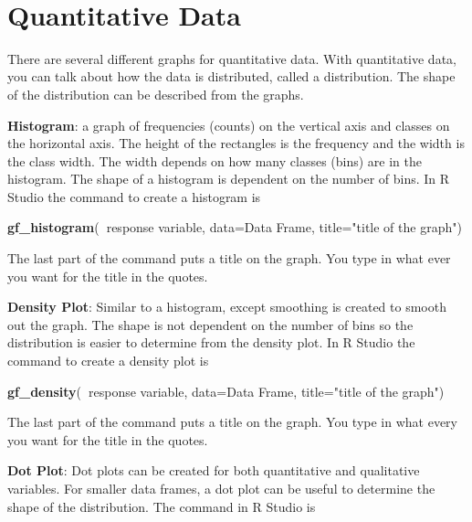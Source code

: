 \documentclass[
]{book}
\newenvironment{Shaded}{\begin{snugshade}}{\end{snugshade}}
\newcommand{\DataTypeTok}[1]{\textcolor[rgb]{0.13,0.29,0.53}{#1}}
\newcommand{\KeywordTok}[1]{\textcolor[rgb]{0.13,0.29,0.53}{\textbf{#1}}}
\newcommand{\NormalTok}[1]{#1}
\newcommand{\OperatorTok}[1]{\textcolor[rgb]{0.81,0.36,0.00}{\textbf{#1}}}
\newcommand{\StringTok}[1]{\textcolor[rgb]{0.31,0.60,0.02}{#1}}
\begin{document}
\emph{\\
}

\hypertarget{quantitative-data}{%
\section{Quantitative Data}\label{quantitative-data}}

There are several different graphs for quantitative data. With quantitative data, you can talk about how the data is distributed, called a distribution. The shape of the distribution can be described from the graphs.

\textbf{Histogram}: a graph of frequencies (counts) on the vertical axis and classes on the horizontal axis. The height of the rectangles is the frequency and the width is the class width. The width depends on how many classes (bins) are in the histogram. The shape of a histogram is dependent on the number of bins. In R Studio the command to create a histogram is

\begin{Shaded}
\begin{Highlighting}[]
\KeywordTok{gf_histogram}\NormalTok{(}\OperatorTok{~}\NormalTok{response variable, }\DataTypeTok{data=}\NormalTok{Data Frame, }\DataTypeTok{title=}\StringTok{"title of the graph"}\NormalTok{)}
\end{Highlighting}
\end{Shaded}

The last part of the command puts a title on the graph. You type in what ever you want for the title in the quotes.

\textbf{Density Plot}: Similar to a histogram, except smoothing is created to smooth out the graph. The shape is not dependent on the number of bins so the distribution is easier to determine from the density plot. In R Studio the command to create a density plot is

\begin{Shaded}
\begin{Highlighting}[]
\KeywordTok{gf_density}\NormalTok{(}\OperatorTok{~}\NormalTok{response variable, }\DataTypeTok{data=}\NormalTok{Data Frame, }\DataTypeTok{title=}\StringTok{"title of the graph"}\NormalTok{)}
\end{Highlighting}
\end{Shaded}

The last part of the command puts a title on the graph. You type in what every you want for the title in the quotes.

\textbf{Dot Plot}: Dot plots can be created for both quantitative and qualitative variables. For smaller data frames, a dot plot can be useful to determine the shape of the distribution. The command in R Studio is
\end{document}
